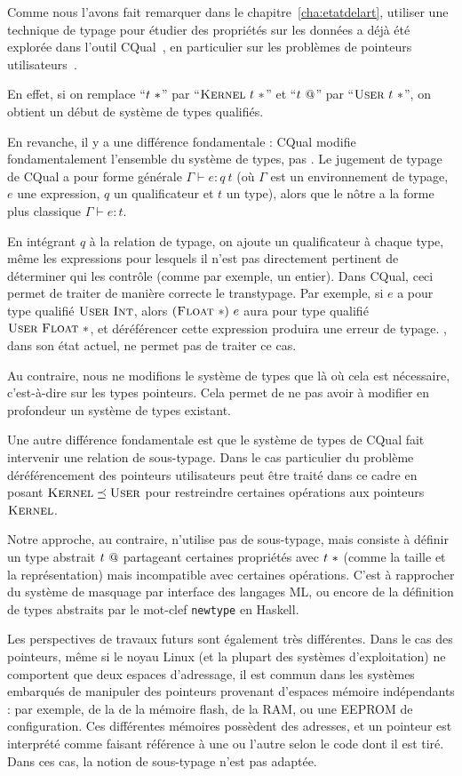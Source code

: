 Comme nous l'avons fait remarquer dans le chapitre~\ref{cha:etatdelart},
utiliser une technique de typage pour étudier des propriétés sur les données a
déjà été explorée dans l'outil CQual~\cite{pldi99}, en particulier sur les
problèmes de pointeurs utilisateurs~\cite{cquk-usenix04}.

En effet, si on remplace ``$t~*$'' par ``$\textsc{Kernel}~t~*$'' et ``$t~@$''
par ``$\textsc{User}~t~*$'', on obtient un début de système de types qualifiés.

En revanche, il y a une différence fondamentale : CQual modifie fondamentalement
l'ensemble du système de types, pas \langname. Le jugement de typage de CQual a
pour forme générale $Γ ⊢ e : q~t$ (où $Γ$ est un environnement de typage, $e$
une expression, $q$ un qualificateur et $t$ un type), alors que le nôtre a la
forme plus classique $Γ ⊢ e : t$.

En intégrant $q$ à la relation de typage, on ajoute un qualificateur à chaque
type, même les expressions pour lesquels il n'est pas directement pertinent de
déterminer qui les contrôle (comme par exemple, un entier). Dans CQual, ceci
permet de traiter de manière correcte le transtypage. Par exemple, si $e$ a pour
type qualifié $\textsc{User}~\textsc{Int}$, alors $(\textsc{Float}~*)~e$ aura pour type qualifié
$\textsc{User}~\textsc{Float}~*$, et déréférencer cette expression produira une erreur de
typage. \langname, dans son état actuel, ne permet pas de traiter ce cas.

Au contraire, nous ne modifions le système de types que là où cela est
nécessaire, c'est-à-dire sur les types pointeurs. Cela permet de ne pas avoir à
modifier en profondeur un système de types existant.

Une autre différence fondamentale est que le système de types de CQual fait
intervenir une relation de sous-typage. Dans le cas particulier du problème
déréférencement des pointeurs utilisateurs peut être traité dans ce cadre en
posant $\textsc{Kernel} \preceq \textsc{User}$ pour restreindre certaines opérations aux
pointeurs $\textsc{Kernel}$.

Notre approche, au contraire, n'utilise pas de sous-typage, mais consiste à
définir un type abstrait $t~@$ partageant certaines propriétés avec
$t~*$ (comme la taille et la représentation) mais incompatible avec
certaines opérations. C'est à rapprocher du système de masquage par interface
des langages ML, ou encore de la définition de types abstraits par le mot-clef
\texttt{newtype} en Haskell.

Les perspectives de travaux futurs sont également très différentes. Dans le cas
des pointeurs, même si le noyau Linux (et la plupart des systèmes
d'exploitation) ne comportent que deux espaces d'adressage, il est commun dans
les systèmes embarqués de manipuler des pointeurs provenant d'espaces mémoire
indépendants : par exemple, de la de la mémoire flash, de la RAM, ou une EEPROM
de configuration. Ces différentes mémoires possèdent des adresses, et un
pointeur est interprété comme faisant référence à une ou l'autre selon le code
dont il est tiré. Dans ces cas, la notion de sous-typage n'est pas adaptée.

